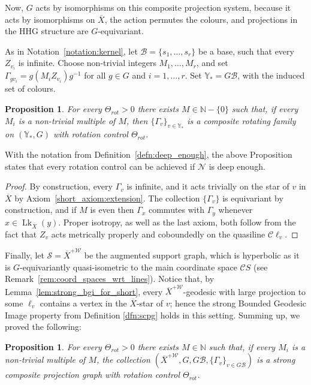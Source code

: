 \documentclass[svgnames]{amsart}
\theoremstyle{plain}
\newtheorem{prop}[thm]{Proposition}
\theoremstyle{definition}
\newcommand{\C}{\mathcal C}
\newcommand{\ov}[1]{\overline{#1}}
\newcommand{\link}{\operatorname{Lk}}
\newcommand{\N}{\mathcal{N}}
\newcommand{\B}{\mathcal{B}}
\newcommand{\W}{\mathcal{W}}
\newcommand{\calS}{\mathcal{S}}
\begin{document}
Now, $G$ acts by isomorphisms on this composite projection system, because it acts by isomorphisms on $\ov X$, the action permutes the colours, and projections in the HHG structure are $G$-equivariant. 

As in Notation~\ref{notation:kernel}, let $\B=\{s_1,\ldots,s_r\}$ be a base, such that every $Z_{v_i}$ is infinite. Choose non-trivial integers $M_1,\ldots,M_r$, and set $\Gamma_{gv_i}=g(M_iZ_{v_i})g^{-1}$ for all $g\in G$ and $i=1,\ldots, r$. Set $\mathbb{Y}_*=G\B$, with the induced set of colours. 

\begin{prop}
    For every $\Theta_{rot}>0$ there exists $M\in \mathbb{N}-\{0\}$ such that, if every $M_i$ is a non-trivial multiple of $M$, then $\{\Gamma_v\}_{v\in \mathbb Y_*}$ is a composite rotating family on $(\mathbb Y_*, G)$ with rotation control $\Theta_{rot}$.
\end{prop}
With the notation from Definition~\ref{defn:deep_enough}, the above Proposition states that every rotation control can be achieved if $\N$ is deep enough.

\begin{proof}
    By construction, every $\Gamma_v$ is infinite, and it acts trivially on the star of $v$ in $\ov X$ by Axiom~\ref{short_axiom:extension}. The collection $\{\Gamma_v\}$ is equivariant by construction, and if $M$ is even then $\Gamma_x$ commutes with $\Gamma_y$ whenever $x\in \link_{\ov X}(y)$. 
    Proper isotropy, as well as the last axiom, both follow from the fact that $Z_v$ acts metrically properly and coboundedly on the quasiline $\C\ell_v$.
\end{proof}

Finally, let $\calS=\ov X^{+\W}$ be the augmented support graph, which is hyperbolic as it is $G$-equivariantly quasi-isometric to the main coordinate space $\C S$ (see Remark~\ref{rem:coord_spaces_wrt_lines}). Notice that, by Lemma~\ref{lem:strong_bgi_for_short}, every $\ov X^{+\W}$-geodesic with large projection to some $\ell_v$ contains a vertex in the $\ov X$-star of $v$; hence the strong Bounded Geodesic Image property from Definition \ref{dfn:scpg} holds in this setting. Summing up, we proved the following:

\begin{prop} For every $\Theta_{rot}>0$ there exists $M\in \mathbb{N}$ such that, if every $M_i$ is a non-trivial multiple of $M$, the collection $(\ov X^{+\W}, G, G\B, \{\Gamma_v\}_{v\in G\B})$ is a strong composite projection graph with rotation control $\Theta_{rot}$.
\end{prop}
\end{document}
